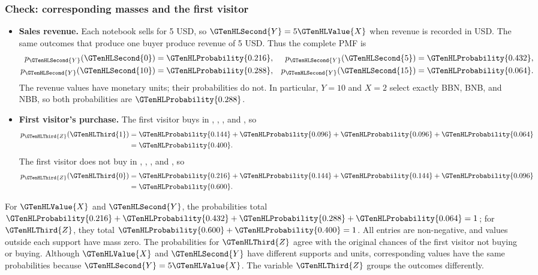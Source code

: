 \subsubsection*{Check: corresponding masses and the first visitor}\label{check:sale-comparisons}
\begin{itemize}
\item \textbf{Sales revenue.}
	Each notebook sells for 5 USD, so $\GTenHLSecond{Y}=5\GTenHLValue{X}$ when revenue
	is recorded in USD. The same outcomes that produce one
	buyer produce revenue of 5 USD. Thus the complete PMF is
	\[
	\begin{aligned}
		p_{\GTenHLSecond{Y}}(\GTenHLSecond{0})&=\GTenHLProbability{0.216}, & p_{\GTenHLSecond{Y}}(\GTenHLSecond{5})&=\GTenHLProbability{0.432},\\
		p_{\GTenHLSecond{Y}}(\GTenHLSecond{10})&=\GTenHLProbability{0.288}, & p_{\GTenHLSecond{Y}}(\GTenHLSecond{15})&=\GTenHLProbability{0.064}.
	\end{aligned}
	\]
	The revenue values have monetary units; their
	probabilities do not. In particular, $Y=10$ and $X=2$ select exactly BBN, BNB, and NBB, so both probabilities are $\GTenHLProbability{0.288}$.

	\item \textbf{First visitor's purchase.}
	The first visitor buys in , , , and , so
	\[
	\begin{aligned}
		p_{\GTenHLThird{Z}}(\GTenHLThird{1})
		&=\GTenHLProbability{0.144}+\GTenHLProbability{0.096}+\GTenHLProbability{0.096}+\GTenHLProbability{0.064}\\
		&=\GTenHLProbability{0.400}.
	\end{aligned}
	\]
	The first visitor does not buy in , , ,
	and , so
	\[
	\begin{aligned}
		p_{\GTenHLThird{Z}}(\GTenHLThird{0})
		&=\GTenHLProbability{0.216}+\GTenHLProbability{0.144}+\GTenHLProbability{0.144}+\GTenHLProbability{0.096}\\
		&=\GTenHLProbability{0.600}.
	\end{aligned}
	\]
\end{itemize}

For $\GTenHLValue{X}$ and $\GTenHLSecond{Y}$, the probabilities total $\GTenHLProbability{0.216}+\GTenHLProbability{0.432}+\GTenHLProbability{0.288}+\GTenHLProbability{0.064}=1$; for $\GTenHLThird{Z}$, they total $\GTenHLProbability{0.600}+\GTenHLProbability{0.400}=1$. All entries are non-negative, and values outside each support have mass zero. The probabilities for $\GTenHLThird{Z}$ agree with the original chances of the first visitor not buying or buying. Although $\GTenHLValue{X}$ and $\GTenHLSecond{Y}$ have different supports and units, corresponding values have the same probabilities because $\GTenHLSecond{Y}=5\GTenHLValue{X}$. The variable $\GTenHLThird{Z}$ groups the outcomes differently.

